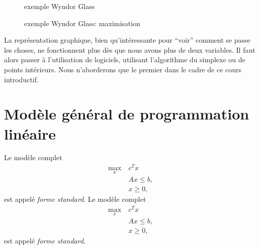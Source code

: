 \begin{example}
\begin{figure}[htbp]
\begin{center}
\end{center}
\caption{exemple Wyndor Glass}
\label{fig:wyndor}
\end{figure}

\begin{figure}[htbp]
\begin{center}
\end{center}
\caption{exemple Wyndor Glass: maximisation}
\label{fig:wyndor_2}
\end{figure}
\end{example}

La représentation graphique, bien qu'intéressante pour ``voir'' comment se passe les choses, ne fonctionnent plus dès que nous avons plus de deux variables.
Il faut alors passer à l'utilisation de logiciels, utilisant l'algorithme du simplexe ou de points intérieurs.
Nous n'aborderons que le premier dans le cadre de ce cours introductif.

\section{Modèle général de programmation linéaire}

Le modèle complet
\begin{align*}
\max_x\ & c^T x \\
& Ax \leq b, \\
& x \geq 0,
\end{align*}
est appelé {\sl forme standard}.
Le modèle complet
\begin{align*}
\max_x\ & c^T x \\
& Ax \leq b, \\
& x \geq 0,
\end{align*}
est appelé {\sl forme standard}.

